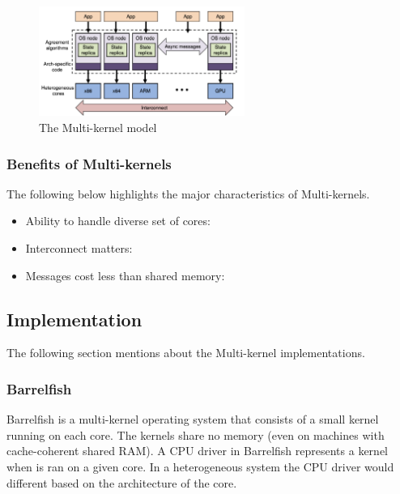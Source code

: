 \begin{figure}[htbp!] 
  \centering    
  \includegraphics[width=0.6\textwidth]{Multi-kernel}
  \caption[Multi-kernel]{The Multi-kernel model \cite{multi_kernel_first_paper}}
  \label{fig:AzeleaKNL}
  \end{figure}

\subsubsection{Benefits of Multi-kernels}
The following below highlights the major characteristics
of Multi-kernels. 

\begin{itemize}
  \item Ability to handle diverse set of cores: 
  \item Interconnect matters: 
  \item Messages cost less than shared memory:
\end{itemize}

\subsection{Implementation}
The following section mentions about the Multi-kernel
implementations. 

\subsubsection{Barrelfish}
Barrelfish\cite{multi_kernel_first_paper} is a multi-kernel operating system that consists of a small kernel 
running on each core. The kernels share no memory (even on 
machines with cache-coherent shared RAM). A CPU 
driver in Barrelfish represents a kernel when is ran 
on a given core. In a heterogeneous system the CPU 
driver would different based on the architecture
of the core. 

